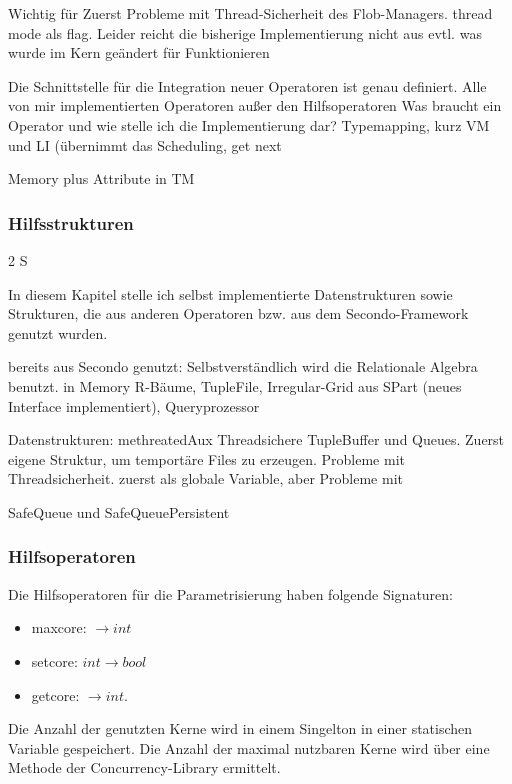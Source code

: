 \documentclass[a4paper,12pt,twoside]{article}
\begin{document}
Wichtig für Zuerst Probleme mit Thread-Sicherheit des Flob-Managers. thread mode als flag. Leider reicht die bisherige Implementierung nicht aus
evtl. was wurde im Kern geändert für Funktionieren

Die Schnittstelle für die Integration neuer Operatoren ist genau definiert. Alle von mir implementierten Operatoren außer den Hilfsoperatoren Was braucht ein Operator und wie stelle ich die Implementierung dar? Typemapping, kurz VM und LI (übernimmt das Scheduling, get next

Memory plus Attribute in TM

\subsubsection{Hilfsstrukturen} 2 S
\label{Hilfsstrukturen} 

In diesem Kapitel stelle ich  selbst implementierte Datenstrukturen sowie Strukturen, die aus anderen Operatoren bzw. aus dem Secondo-Framework genutzt wurden.

bereits aus Secondo genutzt: 
Selbstverständlich wird die Relationale Algebra benutzt. in Memory R-Bäume, TupleFile, Irregular-Grid aus SPart (neues Interface implementiert), Queryprozessor

Datenstrukturen: methreatedAux
Threadsichere TupleBuffer und Queues. Zuerst eigene Struktur, um temportäre Files zu erzeugen. Probleme mit Threadsicherheit. zuerst als globale Variable, aber Probleme mit 

SafeQueue und SafeQueuePersistent



\subsubsection{Hilfsoperatoren}

Die Hilfsoperatoren für die Parametrisierung haben folgende Signaturen:

\begin{itemize}
	\item maxcore: $\longrightarrow int$
	\item setcore: $int \longrightarrow bool$
	\item getcore: $\longrightarrow int$.
\end{itemize}

Die Anzahl der genutzten Kerne wird in einem Singelton in einer statischen Variable gespeichert. Die Anzahl der maximal nutzbaren Kerne wird über eine Methode der Concurrency-Library ermittelt.
\end{document}

